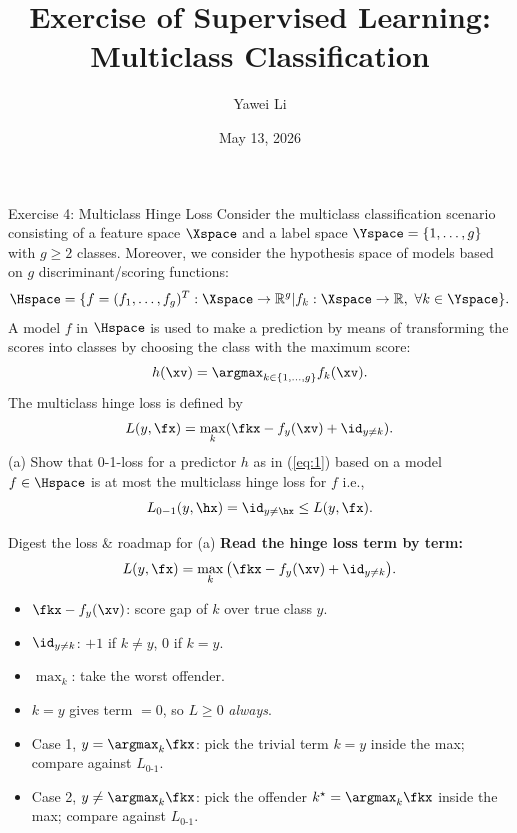 \documentclass[aspectratio=169]{beamer}
\title[]{\textbf{Exercise of Supervised Learning: \\ Multiclass Classification}}
\author{Yawei Li}
\institute[LMU]
{
\\
  \texttt{yawei.li@stat.uni-muenchen.de}
}
\date{May 13, 2026}
\newcommand{\fyx}{f_y(\xv)}
\begin{document}
\begin{frame}
\titlepage

\end{frame}


\begin{frame}{Exercise 4: Multiclass Hinge Loss}
	\small
	Consider the multiclass classification scenario consisting of a feature space $\Xspace$ and a label space $\Yspace = \{1, \ldots, g\}$ with $g \geq 2 $ classes. Moreover, we consider the hypothesis space of models based on $g$ discriminant/scoring functions:
	$$\Hspace = \{ f = (f_1, \ldots, f_g)^T: \Xspace \to \mathbb{R}^g | f_k: \Xspace \to \mathbb{R},  \ \forall k \in \Yspace \}.$$
	A model $f$ in $\Hspace$ is used to make a prediction by means of transforming the scores into classes by choosing the class with the maximum score:
	\begin{align}
		h(\xv) = \argmax_{k \in \{1, \ldots, g \}} f_k(\xv).
		\label{eq:1}
	\end{align} 
	The multiclass hinge loss is defined by $$L(y, \fx) = \max_k (\fkx - f_y(\xv) + \id_{y \neq k}).$$
	(a) Show that 0-1-loss for a predictor $h$ as in (\ref{eq:1}) based on a model $f \in \Hspace$ is at most the multiclass hinge loss for $f$ i.e., $$L_{0-1}(y, \hx) = \id_{y\neq \hx} \leq L(y, \fx).$$
\end{frame}

\begin{frame}{Digest the loss \& roadmap for (a)}
	\small
	\textbf{Read the hinge loss term by term:}
	$$L(y, \fx) = \max_k\big(\fkx - \fyx + \id_{y \neq k}\big).$$
	\begin{itemize}
		\item<1-> $\fkx - \fyx$: score gap of $k$ over true class $y$.
		\item<2-> $\id_{y \neq k}$: $+1$ if $k \neq y$, $0$ if $k = y$.
		\item<3-> $\max_k$: take the worst offender.
		\item<4-> $k = y$ gives term $= 0$, so $L \geq 0$ \emph{always}.
	\end{itemize}

	\vspace{6pt}

	\vspace{6pt}
	\begin{itemize}
		\item<6-> Case 1, $y = \argmax_k \fkx$: pick the trivial term $k = y$ inside the max; compare against $L_{0\text{-}1}$.
		\item<7-> Case 2, $y \neq \argmax_k \fkx$: pick the offender $k^\star = \argmax_k \fkx$ inside the max; compare against $L_{0\text{-}1}$.
	\end{itemize}
\end{frame}
\end{document}

